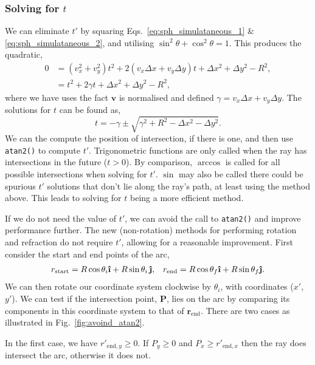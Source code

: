 \documentclass{article}
\let\vec \bm
\newcommand{\uveci}{{\bm{\hat{\textnormal{\bfseries\i}}}}}
\newcommand{\uvecj}{{\bm{\hat{\textnormal{\bfseries\j}}}}}
\newcommand{\mrm}[1]{\mathrm{#1}}
\begin{document}
\subsubsection{Solving for $t$}
We can eliminate $t'$ by squaring Eqs.~\ref{eq:sph_simulataneous_1} \& \ref{eq:sph_simulataneous_2}, and utilising $\sin^2 \theta + \cos^2 \theta = 1$. This produces the quadratic,
\begin{align}
    0
    &=
    (v_x^2 + v_y^2)t^2
    +
    2(v_x \Delta x + v_y \Delta y)t
    +
    \Delta x^2 + \Delta y^2 - R^2, \\
    &=
    t^2
    +
    2 \gamma t
    +
    \Delta x^2 + \Delta y^2 - R^2,
\end{align}
where we have uses the fact $\vec{v}$ is normalised and defined $\gamma = v_x \Delta x + v_y \Delta y$. The solutions for $t$ can be found as,
\begin{equation}
    t
    =
    -\gamma
    \pm
    \sqrt{\gamma^2 + R^2 - \Delta x^2 - \Delta y^2}.
\end{equation}
We can the compute the position of intersection, if there is one, and then use \texttt{atan2()} to compute $t'$. Trigonometric functions are only called when the ray has intersections in the future ($t>0$). By comparison, $\arccos$ is called for all possible intersections when solving for $t'$. $\sin$ may also be called there could be spurious $t'$ solutions that don't lie along the ray's path, at least using the method above. This leads to solving for $t$ being a more efficient method.

If we do not need the value of $t'$, we can avoid the call to \texttt{atan2()} and improve performance further. The new (non-rotation) methods for performing rotation and refraction do not require $t'$, allowing for a reasonable improvement. First consider the start and end points of the arc,
\begin{align}
    r_\mrm{start} = R \cos \theta_i \uveci + R \sin \theta_i \, \uvecj,
    &&
    r_\mrm{end} = R \cos \theta_f \uveci + R \sin \theta_f \uvecj.
\end{align}
We can then rotate our coordinate system clockwise by $\theta_i$, with coordinates ($x'$, $y'$). We can test if the intersection point, $\vec{P}$, lies on the arc by comparing its components in this coordinate system to that of $\vec{r}_\mrm{end}$. There are two cases as illustrated in Fig.~\ref{fig:avoind_atan2}.

In the first case, we have $r'_{\mrm{end},y} \geq 0$. If $P_y \geq 0$ and $P_x \geq r'_{\mrm{end},x}$ then the ray does intersect the arc, otherwise it does not.
\end{document}
